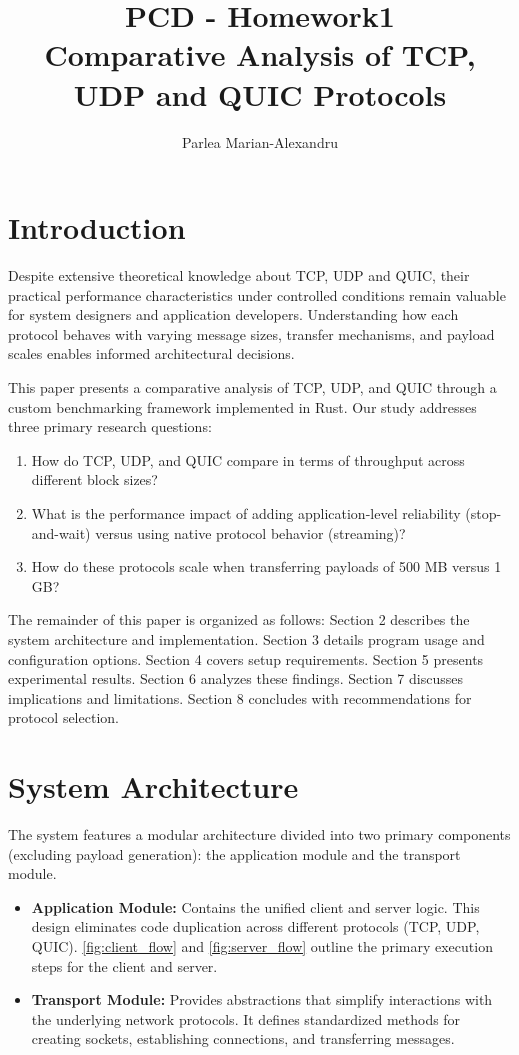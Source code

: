 \documentclass[12pt,a4paper]{article}
\title{PCD - Homework1\\ Comparative Analysis of TCP, UDP and QUIC Protocols}
\author{Parlea Marian-Alexandru}
\date{}
\begin{document}
\maketitle

\section{Introduction}

Despite extensive theoretical knowledge about TCP, UDP and QUIC, their practical performance characteristics under controlled conditions remain valuable for system designers and application developers. Understanding how each protocol behaves with varying message sizes, transfer mechanisms, and payload scales enables informed architectural decisions.

This paper presents a comparative analysis of TCP, UDP, and QUIC through a custom benchmarking framework implemented in Rust. Our study addresses three primary research questions:

\begin{enumerate}
    \item How do TCP, UDP, and QUIC compare in terms of throughput across different block sizes?
    \item What is the performance impact of adding application-level reliability (stop-and-wait) versus using native protocol behavior (streaming)?
    \item How do these protocols scale when transferring payloads of 500 MB versus 1 GB?
\end{enumerate}

The remainder of this paper is organized as follows: Section 2 describes the system architecture and implementation. Section 3 details program usage and configuration options. Section 4 covers setup requirements. Section 5 presents experimental results. Section 6 analyzes these findings. Section 7 discusses implications and limitations. Section 8 concludes with recommendations for protocol selection.


\section{System Architecture}

The system features a modular architecture divided into two primary components (excluding payload generation): the application module and the transport module.

\begin{itemize}
    \item \textbf{Application Module:} Contains the unified client and server logic. This design eliminates code duplication across different protocols (TCP, UDP, QUIC). \autoref{fig:client_flow} and \autoref{fig:server_flow} outline the primary execution steps for the client and server.
    \item \textbf{Transport Module:} Provides abstractions that simplify interactions with the underlying network protocols. It defines standardized methods for creating sockets, establishing connections, and transferring messages.
\end{itemize}
\end{document}
